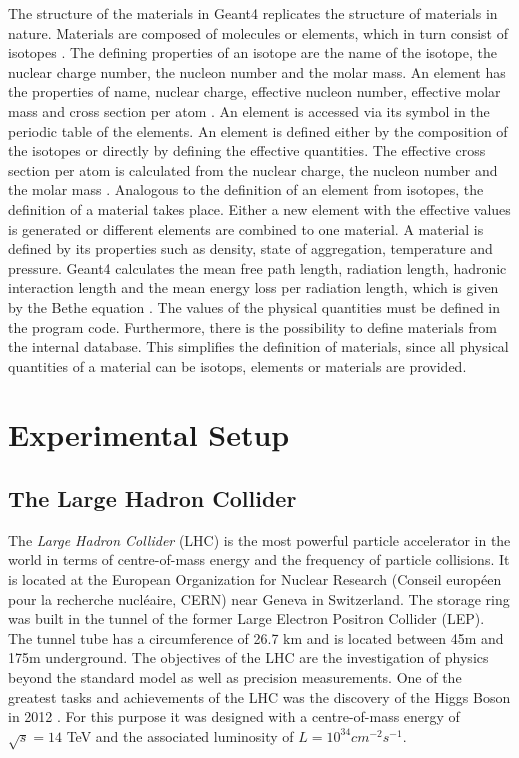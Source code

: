 \documentclass[12pt, a4paper]{thesis}
\begin{document}
The structure of the materials in Geant4 replicates the structure of
materials in nature. Materials are composed of molecules or elements,
which in turn consist of isotopes \cite{geant_simul_toolk}. The
defining properties of an isotope are the name of the isotope, the
nuclear charge number, the nucleon number and the molar mass. An
element has the properties of name, nuclear charge, effective nucleon
number, effective molar mass and cross section per atom
\cite{geant4-doc}. An element is accessed via its symbol in the
periodic table of the elements.  An element is defined either by the
composition of the isotopes or directly by defining the effective
quantities. The effective cross section per atom is calculated from
the nuclear charge, the nucleon number and the molar mass
\cite{geant4-doc}. Analogous to the definition of an element from
isotopes, the definition of a material takes place.  Either a new
element with the effective values is generated or different elements
are combined to one material. A material is defined by its properties
such as density, state of aggregation, temperature and
pressure. Geant4 calculates the mean free path length, radiation
length, hadronic interaction length and the mean energy loss per
radiation length, which is given by the Bethe equation
\cite{geant4-doc}. The values of the physical quantities must be
defined in the program code. Furthermore, there is the possibility to
define materials from the internal database. This simplifies the
definition of materials, since all physical quantities of a material
can be isotops, elements or materials are provided.

\chapter{Experimental Setup}
\label{sec:org5cd8e52}
\section{The Large Hadron Collider}
\label{sec:orgf5b86e0}
The \emph{Large Hadron Collider} (LHC) \cite{lhc_machine} is the most powerful particle
accelerator in the world in terms of centre-of-mass energy and the frequency of
particle collisions. It is located at the European Organization for Nuclear
Research (Conseil européen pour la recherche nucléaire, CERN) near Geneva in
Switzerland. The storage ring was built in the tunnel of the former Large
Electron Positron Collider (LEP). The tunnel tube has a circumference of 26.7 km
and is located between 45m and 175m underground. The objectives of the LHC are
the investigation of physics beyond the standard model as well as precision
measurements. One of the greatest tasks and achievements of the LHC was the
discovery of the Higgs Boson in 2012 \cite{higgs_cms,higgs_atlas}. For this
purpose it was designed with a centre-of-mass energy of \(\sqrt{s} = 14\) TeV and
the associated luminosity of \(L = 10^{34} cm^{-2}s^{-1}\). 
\end{document}
